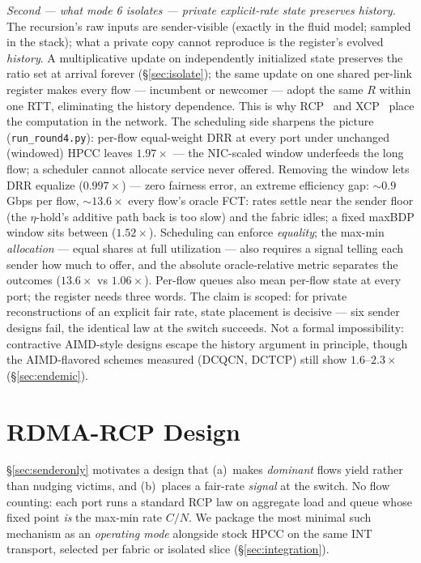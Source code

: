 \documentclass[conference]{IEEEtran}
\begin{document}
\emph{Second --- what mode 6 isolates --- private explicit-rate state preserves history.}
The recursion's raw inputs are sender-visible (exactly in the fluid model; sampled in the
stack); what a private copy cannot reproduce is the register's evolved \emph{history}. A multiplicative
update on independently initialized state preserves the ratio set at arrival forever
(\S\ref{sec:isolate}); the same update on one shared per-link register makes every flow ---
incumbent or newcomer --- adopt the same $R$ within one RTT, eliminating the history
dependence. This is why RCP~\cite{dukkipati2006fct,dukkipati2008rcp} and
XCP~\cite{katabi2002xcp} place the computation in the network. The scheduling side sharpens
the picture (\texttt{run\_round4.py}): per-flow equal-weight DRR at every port under
unchanged (windowed) HPCC leaves $1.97\times$ --- the NIC-scaled window underfeeds the long
flow; a scheduler cannot allocate service never offered. Removing the
window lets DRR equalize ($0.997\times$) --- zero fairness error, an extreme efficiency gap:
${\sim}0.9$ Gbps per flow, ${\sim}13.6\times$ every flow's oracle FCT: rates settle near the sender floor (the
$\eta$-hold's additive path back is too slow) and the fabric idles; a fixed maxBDP window
sits between ($1.52\times$). Scheduling can enforce
\emph{equality}; the max-min \emph{allocation} --- equal shares at full utilization --- also
requires a signal telling each sender how much to offer, and the absolute oracle-relative metric
separates the outcomes ($13.6\times$ vs $1.06\times$). Per-flow queues also mean per-flow
state at every port; the register needs three words. The claim is scoped: for private reconstructions of an
explicit fair rate, state placement is decisive --- six sender designs fail, the identical
law at the switch succeeds. Not a formal impossibility: contractive AIMD-style designs escape
the history argument in principle, though the AIMD-flavored schemes measured (DCQCN, DCTCP)
still show $1.6$--$2.3\times$ (\S\ref{sec:endemic}).

\section{RDMA-RCP Design}
\label{sec:design}

\S\ref{sec:senderonly} motivates a design that (a)~makes \emph{dominant} flows yield
rather than nudging victims, and (b)~places a fair-rate \emph{signal} at the switch. No flow
counting: each port runs a standard RCP law on aggregate load and queue whose fixed point
\emph{is} the max-min rate $C/N$. We package the most minimal such mechanism as an \emph{operating mode} alongside stock
HPCC on the same INT transport, selected per fabric or isolated slice
(\S\ref{sec:integration}).
\end{document}
